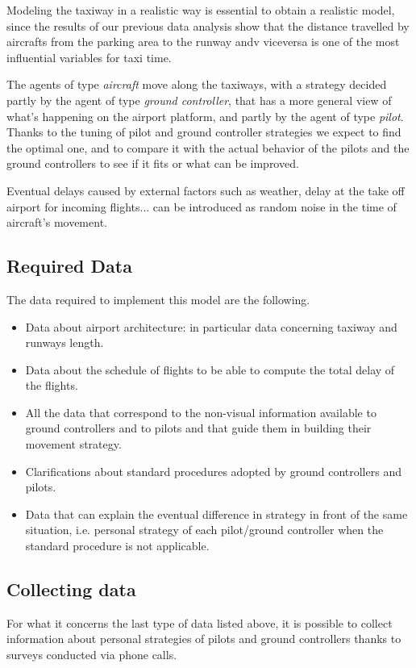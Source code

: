 \documentclass{article}
\begin{document}
Modeling the taxiway in a realistic way is essential to obtain a realistic model, since the results of our previous data analysis show that the distance travelled by aircrafts from the parking area to the runway andv viceversa is one of the most influential variables for taxi time.

The agents of type \textit{aircraft} move along the taxiways, with a strategy decided partly by the agent of type \textit{ground controller}, that has a more general view of what's happening on the airport platform, and partly by the agent of type \textit{pilot}. Thanks to the tuning of pilot and ground controller strategies we expect to find the optimal one, and to compare it with the actual behavior of the pilots and the ground controllers to see if it fits or what can be improved.

Eventual delays caused by external factors such as weather, delay at the take off airport for incoming flights... can be introduced as random noise in the time of aircraft's movement.
\subsection{Required Data}
The data required to implement this model are the following.
\begin{itemize}
	\item Data about airport architecture: in particular data concerning taxiway and runways length.
	\item Data about the schedule of flights to be able to compute the total delay of the flights.
	\item All the data that correspond to the non-visual information available to ground controllers and to pilots and that guide them in building their movement strategy.
	\item Clarifications about standard procedures adopted by ground controllers and pilots.
	\item Data that can explain the eventual difference in strategy in front of the same situation, i.e. personal strategy of each pilot/ground controller when the standard procedure is not applicable.
\end{itemize}
\subsection{Collecting data}
For what it concerns the last type of data listed above, it is possible to collect information about personal strategies of pilots and ground controllers thanks to surveys conducted via phone calls.
\end{document}
